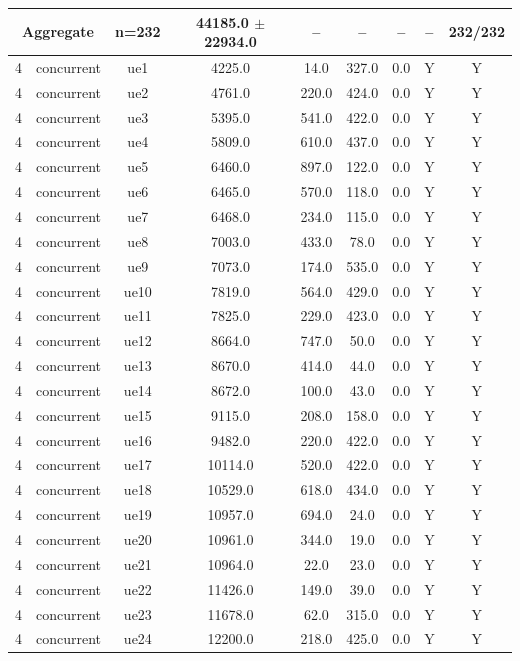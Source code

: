 \begin{table}[ht]
\begin{tabular}{|c|c|c|c|c|c|c|c|c|}
\multicolumn{2}{|c|}{\textbf{Aggregate}} & n=232 & 44185.0 $\pm$ 22934.0 & -- & -- & -- & -- & 232/232 \\
\hline
4 & concurrent & ue1 & 4225.0 & 14.0 & 327.0 & 0.0 & Y & Y \\
4 & concurrent & ue2 & 4761.0 & 220.0 & 424.0 & 0.0 & Y & Y \\
4 & concurrent & ue3 & 5395.0 & 541.0 & 422.0 & 0.0 & Y & Y \\
4 & concurrent & ue4 & 5809.0 & 610.0 & 437.0 & 0.0 & Y & Y \\
4 & concurrent & ue5 & 6460.0 & 897.0 & 122.0 & 0.0 & Y & Y \\
4 & concurrent & ue6 & 6465.0 & 570.0 & 118.0 & 0.0 & Y & Y \\
4 & concurrent & ue7 & 6468.0 & 234.0 & 115.0 & 0.0 & Y & Y \\
4 & concurrent & ue8 & 7003.0 & 433.0 & 78.0 & 0.0 & Y & Y \\
4 & concurrent & ue9 & 7073.0 & 174.0 & 535.0 & 0.0 & Y & Y \\
4 & concurrent & ue10 & 7819.0 & 564.0 & 429.0 & 0.0 & Y & Y \\
4 & concurrent & ue11 & 7825.0 & 229.0 & 423.0 & 0.0 & Y & Y \\
4 & concurrent & ue12 & 8664.0 & 747.0 & 50.0 & 0.0 & Y & Y \\
4 & concurrent & ue13 & 8670.0 & 414.0 & 44.0 & 0.0 & Y & Y \\
4 & concurrent & ue14 & 8672.0 & 100.0 & 43.0 & 0.0 & Y & Y \\
4 & concurrent & ue15 & 9115.0 & 208.0 & 158.0 & 0.0 & Y & Y \\
4 & concurrent & ue16 & 9482.0 & 220.0 & 422.0 & 0.0 & Y & Y \\
4 & concurrent & ue17 & 10114.0 & 520.0 & 422.0 & 0.0 & Y & Y \\
4 & concurrent & ue18 & 10529.0 & 618.0 & 434.0 & 0.0 & Y & Y \\
4 & concurrent & ue19 & 10957.0 & 694.0 & 24.0 & 0.0 & Y & Y \\
4 & concurrent & ue20 & 10961.0 & 344.0 & 19.0 & 0.0 & Y & Y \\
4 & concurrent & ue21 & 10964.0 & 22.0 & 23.0 & 0.0 & Y & Y \\
4 & concurrent & ue22 & 11426.0 & 149.0 & 39.0 & 0.0 & Y & Y \\
4 & concurrent & ue23 & 11678.0 & 62.0 & 315.0 & 0.0 & Y & Y \\
4 & concurrent & ue24 & 12200.0 & 218.0 & 425.0 & 0.0 & Y & Y \\

\end{tabular}
\end{table}
